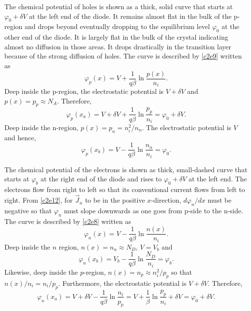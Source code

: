 The chemical potential of holes is shown as a thick, solid curve that starts at
$\varphi_0 + \delta V$ at the left end of the diode. It remains almost flat in
the bulk of the p-region and drops beyond eventually dropping to the 
equilibrium level $\varphi_0$ at the other end of the diode. It is largely flat
in the bulk of the crystal indicating almost no diffusion in those areas. It 
drops drastically in the transition layer because of the strong diffusion of 
holes. The curve is described by \eqref{c2e9} written as
\[
\varphi_p(x) = V + \frac{1}{q\beta}\ln\frac{p(x)}{n_i}.
\]
Deep inside the p-region, the electrostatic potential is $V + \delta V$ and
$p(x) = p_p \approx N_A$. Therefore,
\[
\varphi_p(x_a) = V + \delta V + \frac{1}{q\beta}\ln\frac{p_p}{n_i} =
\varphi_0 + \delta V.
\]
Deep inside the n-region, $p(x) = p_n = n_i^2/n_n$. The electrostatic potential
is $V$ and hence,
\[
\varphi_p(x_b) = V - \frac{1}{q\beta}\ln\frac{n_n}{n_i} = \varphi_0.
\]

The chemical potential of the electrons is shown as thick, small-dashed curve 
that starts at $\varphi_b$ at the right end of the diode and rises to
$\varphi_0 + \delta V$ at the left end. The electrons flow from right to left
so that its conventional current flows from left to right. From \eqref{c2e12},
for $\vec{J}_n$ to be in the positive $x$-direction, $d\varphi_n/dx$ must be
negative so that $\varphi_n$ must slope downwards as one goes from p-side to
the n-side. The curve is described by \eqref{c2e8} written as
\[
\varphi_n(x) = V - \frac{1}{q\beta}\ln\frac{n(x)}{n_i}.
\]
Deep inside the $n$ region, $n(x) = n_n \approx N_D$, $V = V_b$ and
\[
\varphi_n(x_b) = V_b - \frac{1}{q\beta}\ln\frac{N_D}{n_i} = \varphi_b.
\]
Likewise, deep inside the $p$-region, $n(x) = n_p \approx n_i^2/p_p$ so that 
$n(x)/n_i = n_i/p_p$. Furthermore, the electrostatic potential is $V + \delta V$.
Therefore,
\[
\varphi_n(x_a) = V + \delta V - \frac{1}{q\beta}\ln\frac{n_i}{p_p} =
V + \frac{1}{\beta}\ln\frac{p_p}{n_i} + \delta V = \varphi_0 + \delta V.
\]


